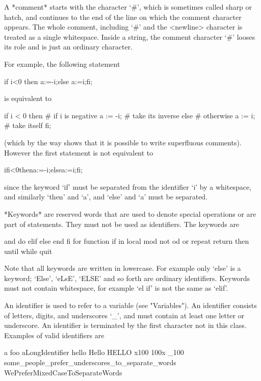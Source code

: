 A *comment* starts with the  character `\#', which is sometimes called
sharp or hatch, and continues to the end of the line on which the comment
character appears. The whole comment, including `\#' and the <newline>
character is treated as a single  whitespace. Inside a string, the
comment character `\#' looses its role and is just an ordinary character.

For example, the following statement

\begintt
if i<0 then a:=-i;else a:=i;fi;
\endtt

is equivalent to

\begintt
if i < 0 then   # if i is negative
  a := -i;      #   take its inverse
else            # otherwise
  a := i;       #   take itself
fi;
\endtt

(which by the way shows that it is possible to write superfluous
comments). However the first statement is not equivalent to

\begintt
ifi<0thena:=-i;elsea:=i;fi;
\endtt

since the keyword `if' must be separated from the identifier `i' by a
whitespace, and similarly `then' and `a', and `else' and `a' must be
separated.


*Keywords* are reserved words that are used to denote special operations
or are part of statements. They must not be used as identifiers. The
keywords are

\begintt
and     do       elif   else    end     fi
for     function if     in      local   mod
not     od       or     repeat  return  then
until   while    quit
\endtt

Note that all keywords are written in lowercase. For example only `else'
is  a keyword; `Else', `eLsE', `ELSE'  and  so forth are ordinary
identifiers. Keywords must not contain whitespace, for example `el if'
is not the same as `elif'.


An identifier is used to refer to  a variable (see "Variables").  An
identifier consists of letters, digits, and underscores `\_', and must
contain at least one letter or underscore.  An identifier is terminated
by the first character not in this class. Examples of valid identifiers
are

\begintt
a           foo         aLongIdentifier
hello       Hello       HELLO
x100        100x       _100
some_people_prefer_underscores_to_separate_words
WePreferMixedCaseToSeparateWords
\endtt


